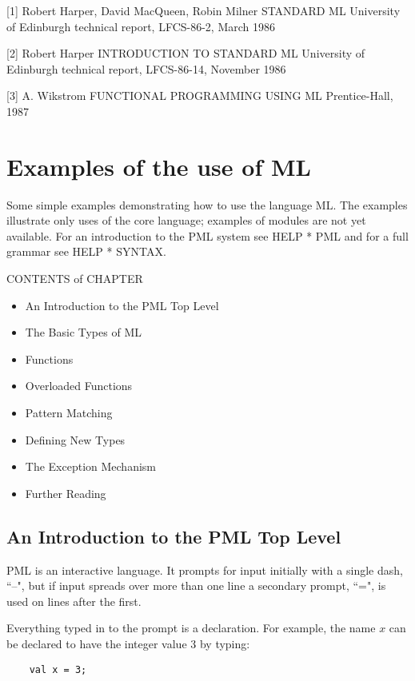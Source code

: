 [1] Robert Harper, David MacQueen, Robin Milner
    STANDARD ML
    University of Edinburgh technical report, LFCS-86-2, March 1986

[2] Robert Harper
    INTRODUCTION TO STANDARD ML
    University of Edinburgh technical report, LFCS-86-14, November 1986

[3] A. Wikstrom
    FUNCTIONAL PROGRAMMING USING ML
    Prentice-Hall, 1987



\chapter{Examples of the use of ML}

Some simple examples demonstrating how to use the language ML. The
examples illustrate only uses of the core language; examples of modules
are not yet available. For an introduction to the PML system see
HELP * PML and for a full grammar see HELP * SYNTAX.


         CONTENTS of CHAPTER

\begin{itemize}
 \item An Introduction to the PML Top Level
 \item The Basic Types of ML
 \item Functions
 \item Overloaded Functions
 \item Pattern Matching
 \item Defining New Types
 \item The Exception Mechanism
 \item Further Reading
\end{itemize}

\section{An Introduction to the PML Top Level}

PML is an interactive language. It prompts for input initially with a
single dash, ``--", but if input spreads over more than one line a
secondary prompt, ``=", is used on lines after the first.

Everything typed in to the prompt is a declaration. For example, the
name $x$ can be declared to have the integer value 3 by typing:
\begin{verbatim}
	val x = 3;
\end{verbatim}

